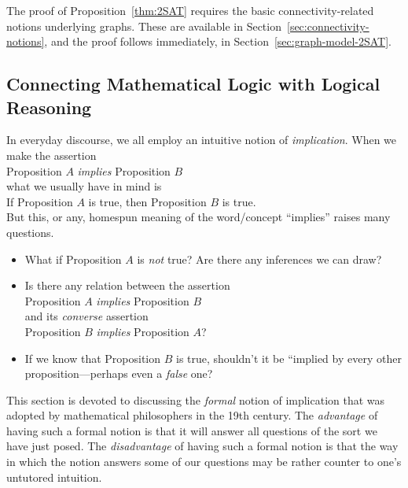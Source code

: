 The proof of Proposition~\ref{thm:2SAT} requires the basic
connectivity-related notions underlying graphs.  These are available
in Section~\ref{sec:connectivity-notions}, and the proof follows
immediately, in Section~\ref{sec:graph-model-2SAT}.



\subsection{Connecting Mathematical Logic with Logical Reasoning}
\label{sec:practical-logic}


In everyday discourse, we all employ an intuitive notion of {\it implication}.
When we make the assertion \\
\hspace*{.35in}Proposition $A$ {\it implies} Proposition $B$ \\
what we usually have in mind is \\
\hspace*{.35in}If Proposition $A$ is true, then Proposition $B$ is true. \\
But this, or any, homespun meaning of the word/concept ``implies''
raises many questions.
\begin{itemize}
\item
What if Proposition $A$ is {\em not} true?  Are there any inferences
we can draw?

\item
Is there any relation between the assertion \\
\hspace*{.35in}Proposition $A$ {\it implies} Proposition $B$ \\
and its {\it converse}
assertion \\
\hspace*{.35in}Proposition $B$ {\it implies} Proposition $A$?

\item
If we know that Proposition $B$ is true, shouldn't it be ``implied by
every other proposition---perhaps even a {\em false} one?
\end{itemize}
This section is devoted to discussing the {\em formal} notion of
implication
%
that was adopted by mathematical philosophers in the 19th century.
The {\em advantage} of having such a formal notion is that it will
answer all questions of the sort we have just posed.  The {\em
  disadvantage} of having such a formal notion is that the way in
which the notion answers some of our questions may be rather counter
to one's untutored intuition.
